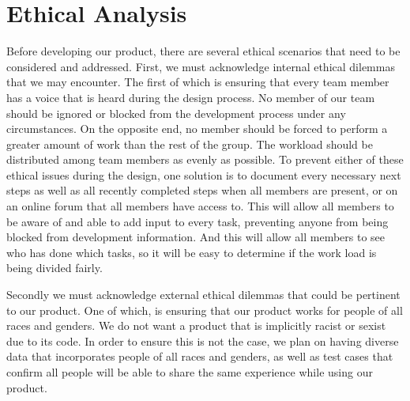 \chapter{Ethical Analysis}

Before developing our product, there are several ethical scenarios that need to be considered and addressed.
First, we must acknowledge internal ethical dilemmas that we may encounter.  The first of which is ensuring that every team member has a voice that is heard during the design process.  No member of our team should be ignored or blocked from the development process under any circumstances.  On the opposite end, no member should be forced to perform a greater amount of work than the rest of the group.  The workload should be distributed among team members as evenly as possible.  To prevent either of these ethical issues during the design, one solution is to document every necessary next steps as well as all recently completed steps when all members are present, or on an online forum that all members have access to.  This will allow all members to be aware of and able to add input to every task, preventing anyone from being blocked from development information.  And this will allow all members to see who has done which tasks, so it will be easy to determine if the work load is being divided fairly.

Secondly we must acknowledge external ethical dilemmas that could be pertinent to our product.  One of which, is ensuring that our product works for people of all races and genders.  We do not want a product that is implicitly racist or sexist due to its code.  In order to ensure this is not the case, we plan on having  diverse data that incorporates people of all races and genders, as well as test cases that confirm all people will be able to share the same experience while using our product.